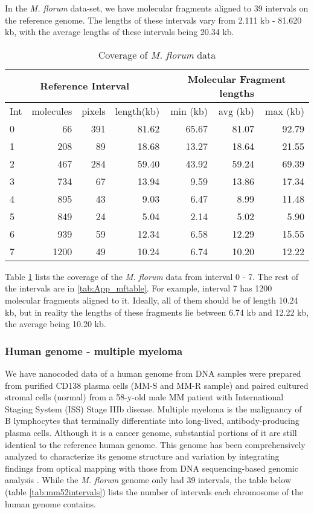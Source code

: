 In the {\emph{M. florum}} data-set, we have molecular fragments aligned to 39 intervals on the reference genome. The lengths of these intervals vary from 2.111 kb - 81.620 kb, with the average lengths of these intervals being 20.34 kb. 
\begin{table}[H]
\centering
\begin{tabular}{lrrr|rrr}
  \hline
  \hline
  \multicolumn{4}{c}{Reference Interval} & \multicolumn{3}{c}{Molecular Fragment lengths} \\
  \hline
   Int  & molecules & pixels & length(kb) & min (kb) & avg (kb) & max (kb)\\ 
  \hline
  \hline
    0 &  66 & 391 & 81.62 & 65.67 & 81.07 & 92.79 \\ 
    1 & 208 & 89 & 18.68 & 13.27 & 18.64 & 21.55 \\ 
    2 & 467 & 284 & 59.40 & 43.92 & 59.24 & 69.39 \\ 
    3 & 734 & 67 & 13.94 & 9.59 & 13.86 & 17.34 \\ 
    4 & 895 & 43 & 9.03 & 6.47 & 8.99 & 11.48 \\ 
    5 & 849 & 24 & 5.04 & 2.14 & 5.02 & 5.90 \\ 
    6 & 939 & 59 & 12.34 & 6.58 & 12.29 & 15.55 \\ 
    7 & 1200 & 49 & 10.24 & 6.74 & 10.20 & 12.22 \\ 
  \hline
  \hline
\end{tabular}
\caption{Coverage of {\emph{M. florum}} data}
\label{tab:mftable}
\end{table}

Table \ref{tab:mftable} lists the coverage of the {\emph{M. florum}} data from interval 0 - 7. The rest of the intervals are in \ref{tab:App_mftable}. For example, interval 7 has 1200 molecular fragments aligned to it. Ideally, all of them should be of length 10.24 kb, but in reality the lengths of these fragments lie between 6.74 kb and 12.22 kb, the average being 10.20 kb. 

\subsubsection*{Human genome - multiple myeloma}
We have nanocoded data of a human genome from DNA samples were prepared from purified CD138 plasma cells (MM-S and MM-R sample) and paired cultured stromal cells (normal) from a 58-y-old male MM patient with International Staging System (ISS) Stage IIIb disease. Multiple myeloma is the malignancy of B lymphocytes that terminally differentiate into long-lived, antibody-producing plasma cells. Although it is a cancer genome, substantial portions of it are still identical to the reference human genome. This genome has been comprehensively analyzed to characterize its genome structure and variation by integrating findings from optical mapping with those from DNA sequencing-based genomic analysis \cite{Gupta_etal_2015_PNAS}. While the {\emph{M. florum}} genome only had 39 intervals, the table below (table \ref{tab:mm52intervals}) lists the number of intervals each chromosome of the human genome contains.


